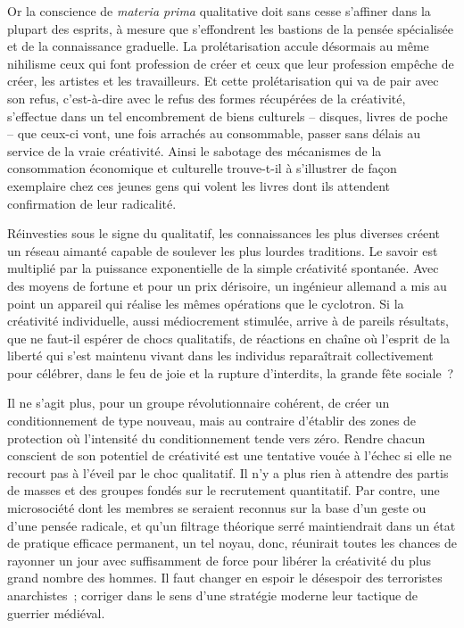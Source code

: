 \documentclass[french,twoside]{book} %
\begin{document}
\noindent Or la conscience de \emph{materia prima} qualitative doit sans cesse s’affiner dans la plupart des esprits, à mesure que s’effondrent les bastions de la pensée spécialisée et de la connaissance graduelle. La prolétarisation accule désormais au même nihilisme ceux qui font profession de créer et ceux que leur profession empêche de créer, les artistes et les travailleurs. Et cette prolétarisation qui va de pair avec son refus, c’est-à-dire avec le refus des formes récupérées de la créativité, s’effectue dans un tel encombrement de biens culturels – disques, livres de poche – que ceux-ci vont, une fois arrachés au consommable, passer sans délais au service de la vraie créativité. Ainsi le sabotage des mécanismes de la consommation économique et culturelle trouve-t-il à s’illustrer de façon exemplaire chez ces jeunes gens qui volent les livres dont ils attendent confirmation de leur radicalité.\par
Réinvesties sous le signe du qualitatif, les connaissances les plus diverses créent un réseau aimanté capable de soulever les plus lourdes traditions. Le savoir est multiplié par la puissance exponentielle de la simple créativité spontanée. Avec des moyens de fortune et pour un prix dérisoire, un ingénieur allemand a mis au point un appareil qui réalise les mêmes opérations que le cyclotron. Si la créativité individuelle, aussi médiocrement stimulée, arrive à de pareils résultats, que ne faut-il espérer de chocs qualitatifs, de réactions en chaîne où l’esprit de la liberté qui s’est maintenu vivant dans les individus reparaîtrait collectivement pour célébrer, dans le feu de joie et la rupture d’interdits, la grande fête sociale ?\par
Il ne s’agit plus, pour un groupe révolutionnaire cohérent, de créer un conditionnement de type nouveau, mais au contraire d’établir des zones de protection où l’intensité du conditionnement tende vers zéro. Rendre chacun conscient de son potentiel de créativité est une tentative vouée à l’échec si elle ne recourt pas à l’éveil par le choc qualitatif. Il n’y a plus rien à attendre des partis de masses et des groupes fondés sur le recrutement quantitatif. Par contre, une microsociété dont les membres se seraient reconnus sur la base d’un geste ou d’une pensée radicale, et qu’un filtrage théorique serré maintiendrait dans un état de pratique efficace permanent, un tel noyau, donc, réunirait toutes les chances de rayonner un jour avec suffisamment de force pour libérer la créativité du plus grand nombre des hommes. Il faut changer en espoir le désespoir des terroristes anarchistes ; corriger dans le sens d’une stratégie moderne leur tactique de guerrier médiéval.
\end{document}
